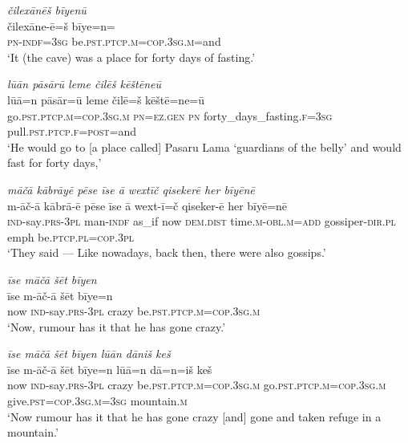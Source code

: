 \ea \label{ŽP.120}
\textit{čilexānēš bīyenū} \\ 
\gll čilexāne-ē=š bīye=n=\\ 
 \textsc{pn}\textsc{-indf}\textsc{=3sg} be\textsc{.pst}\textsc{.ptcp}\textsc{.m}\textsc{=cop}\textsc{.3sg}\textsc{.m}=and \\ 
\glt `It (the cave) was a place for forty days of fasting.'
\z 
 
\ea \label{ŽP.122}
\textit{lūān pāsārū leme čilēš kēštēneū} \\ 
\gll lūā=n pāsār=ū leme čilē=š kēštē=ne=ū \\ 
 go\textsc{.pst}\textsc{.ptcp}\textsc{.m}\textsc{=cop}\textsc{.3sg}\textsc{.m} \textsc{pn}\textsc{\textsc{=ez.gen}} \textsc{pn} forty\_days\_fasting\textsc{.f}\textsc{=3sg} pull\textsc{.pst}\textsc{.ptcp}\textsc{.f}\textsc{=\textsc{post}}=and \\ 
\glt `He would go to [a place called] Pasaru Lama ‘guardians of the belly’ and would fast for forty days,'
\z 
 
\ea \label{ŽP.125}
\textit{māčā kābrāyē pēse īse ā wextīč qisekerē her bīyēnē} \\ 
\gll m-āč-ā kābrā-ē pēse īse ā wext-ī=č qiseker-ē her bīyē=nē \\ 
 \textsc{ind-}say\textsc{.prs}\textsc{-3pl} man\textsc{-indf} as\_if now \textsc{dem.dist} time\textsc{.m}\textsc{-obl}\textsc{.m}\textsc{=add} gossiper\textsc{-dir}\textsc{.pl} emph be\textsc{.ptcp}\textsc{.pl}\textsc{=cop}\textsc{.3pl} \\ 
\glt `They said — Like nowadays, back then, there were also gossips.'
\z 
 
\ea \label{ŽP.127}
\textit{īse māčā šēt bīyen} \\ 
\gll īse m-āč-ā šēt bīye=n \\ 
 now \textsc{ind-}say\textsc{.prs}\textsc{-3pl} crazy be\textsc{.pst}\textsc{.ptcp}\textsc{.m}\textsc{=cop}\textsc{.3sg}\textsc{.m} \\ 
\glt `Now, rumour has it that he has gone crazy.'
\z 
 
\ea \label{ŽP.128}
\textit{īse māčā šēt bīyen lūān dāniš keš} \\ 
\gll īse m-āč-ā šēt bīye=n lūā=n dā=n=iš keš \\ 
 now \textsc{ind-}say\textsc{.prs}\textsc{-3pl} crazy be\textsc{.pst}\textsc{.ptcp}\textsc{.m}\textsc{=cop}\textsc{.3sg}\textsc{.m} go\textsc{.pst}\textsc{.ptcp}\textsc{.m}\textsc{=cop}\textsc{.3sg}\textsc{.m} give\textsc{.pst}\textsc{=cop}\textsc{.3sg}\textsc{.m}\textsc{=3sg} mountain\textsc{.m} \\ 
\glt `Now rumour has it that he has gone crazy [and] gone and taken refuge in a mountain.'
\z 
 
